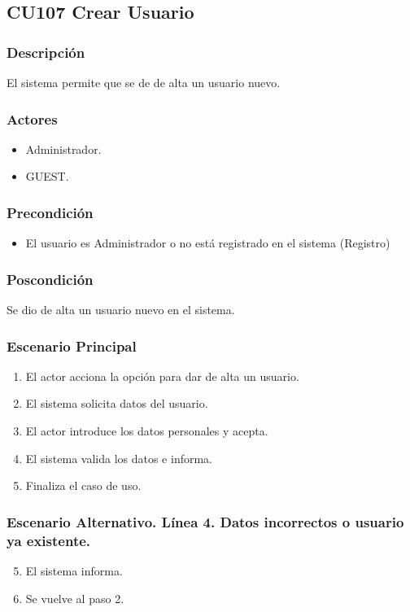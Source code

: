 \subsection{CU107 Crear Usuario}
\subsubsection{Descripci\'{o}n}
El sistema permite que se de de alta un usuario nuevo.
\subsubsection{Actores}
\begin{itemize}
\item Administrador.
\item GUEST.
\end{itemize}
\subsubsection{Precondici\'{o}n}
\begin{itemize}
\item El usuario es Administrador o no est\'{a} registrado en el sistema (Registro)
\end{itemize}
\subsubsection{Poscondici\'{o}n}
Se dio de alta un usuario nuevo en el sistema.
\subsubsection{Escenario Principal}
\begin{enumerate}
\item El actor acciona la opci\'{o}n para dar de alta un usuario.
\item El sistema solicita datos del usuario.
\item El actor introduce los datos personales y acepta.
\item El sistema valida los datos e informa.
\item Finaliza el caso de uso.
\end{enumerate}
\subsubsection{Escenario Alternativo. L\'{i}nea 4. Datos incorrectos o usuario ya existente.}
\begin{enumerate}
\setcounter{enumi}{4}
\item El sistema informa.
\item Se vuelve al paso 2.
\end{enumerate}
